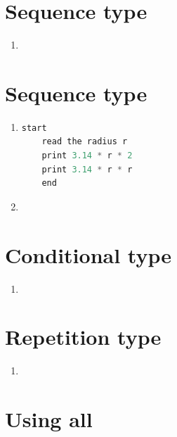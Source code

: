 \documentclass[11pt, a4paper]{article}
\begin{document}
\section{Sequence type}
\begin{enumerate}
  \item 
\end{enumerate}
\section{Sequence type}
\begin{enumerate}
  \item 
  \begin{lstlisting}[language=C] 
    start
    read the radius r
    print 3.14 * r * 2
    print 3.14 * r * r
    end
 \end{lstlisting}
 \item 
\end{enumerate}
\section{Conditional type}
\begin{enumerate}
  \item 
\end{enumerate}
\section{Repetition type}
\begin{enumerate}
  \item 
\end{enumerate}
\section{Using all}
\end{document}
